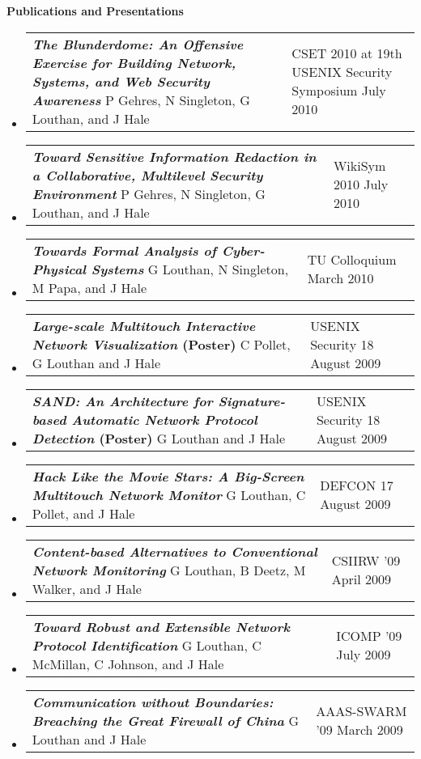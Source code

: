 \documentclass[letterpaper,11pt]{article}
\makeatletter
\newcommand{\resheading}[1]{{\large \colorbox{mygrey}{\begin{minipage}
    {\textwidth}{\textbf{#1 \vphantom{p\^{E}}}}\end{minipage}}}}
\newcommand{\resentry}[3][0pt]{
    \begin{tabular*}{0.9\textwidth}[t]{@{\hspace{#1}}p{5.0in-#1}@{\extracolsep{\fill}}p{0.75in}}
        #2 & #3
        \tabularnewline
    \end{tabular*} %
}
\newcommand{\ressubheading}[4]{
    \resentry{\textbf{#1} \newline #3}{#2 \newline #4}    
}
\makeatother
\begin{document}
\resheading{Publications and Presentations}
\begin{itemize}
\item
	\ressubheading{\emph{The Blunderdome: An Offensive Exercise for Building Network, Systems, and Web Security Awareness}\footnotemark[1]}{CSET 2010 at 19th USENIX Security Symposium}{P Gehres, N Singleton, G Louthan, and J Hale}{July 2010}
\item
	\ressubheading{\emph{Toward Sensitive Information Redaction in a Collaborative, Multilevel Security Environment}\footnotemark[1]}{WikiSym 2010}{P Gehres, N Singleton, G Louthan, and J Hale}{July 2010}
\item
	\ressubheading{\emph{Towards Formal Analysis of Cyber-Physical Systems}}{TU Colloquium}{G Louthan, N Singleton, M Papa, and J Hale}{March 2010}
\item
	\ressubheading{\emph{Large-scale Multitouch Interactive Network Visualization} (Poster)}{USENIX Security 18}{C Pollet, G Louthan and J Hale}{August 2009}
\item
	\ressubheading{\emph{SAND: An Architecture for Signature-based Automatic Network Protocol Detection} (Poster)}{USENIX Security 18}{G Louthan and J Hale}{August 2009}
\item
	\ressubheading{\emph{Hack Like the Movie Stars: A Big-Screen Multitouch Network Monitor}}{DEFCON 17}{G Louthan, C Pollet, and J Hale}{August 2009}
\item
	\ressubheading{\emph{Content-based Alternatives to Conventional Network Monitoring}\footnotemark[1]}{CSIIRW '09}{G Louthan, B Deetz, M Walker, and J Hale}{April 2009}
\item
	\ressubheading{\emph{Toward Robust and Extensible Network Protocol Identification}\footnotemark[1]}{ICOMP '09}{G Louthan, C McMillan, C Johnson, and J Hale}{July 2009}
\item
	\ressubheading{\emph{Communication without Boundaries: Breaching the Great Firewall of China}}{AAAS-SWARM '09}{G Louthan and J Hale}{March 2009}
\end{itemize}

\end{document}
